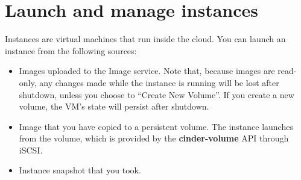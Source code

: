 \chapter{Launch and manage instances}\label{cha:launch-manage-inst}
Instances are virtual machines that run inside the cloud. You can launch
an \gls{instance} from the following sources:

\begin{itemize}
\item Images uploaded to the Image service.  Note that, because images
    are read-only, any changes made while the instance is running will
    be lost after shutdown, unless you choose to ``Create New
    Volume''.  If you create a new volume, the VM's state will persist
    after shutdown.
  \item Image that you have copied to a persistent volume. The instance
  launches from the volume, which is provided by the
  \textbf{cinder-volume} API through iSCSI.
\item Instance snapshot that you took.
\end{itemize}

